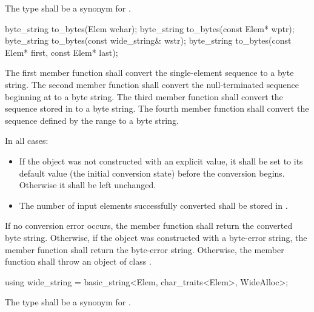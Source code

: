\begin{itemdescr}
\pnum
The type shall be a synonym for .
\end{itemdescr}

%
\begin{itemdecl}
byte_string to_bytes(Elem wchar);
byte_string to_bytes(const Elem* wptr);
byte_string to_bytes(const wide_string& wstr);
byte_string to_bytes(const Elem* first, const Elem* last);
\end{itemdecl}

\begin{itemdescr}
\pnum
\effects
The first member function shall convert the single-element sequence  to a byte string.
The second member function shall convert the null-terminated sequence beginning at  to
a byte string. The third member function shall convert the sequence stored in  to a
byte string. The fourth member function shall convert the sequence defined by the
range  to a byte string.

\pnum
In all cases:

\begin{itemize}
\item If the  object was not constructed with an explicit value, it
shall be
set to its default value (the initial conversion state) before the
conversion begins. Otherwise it shall be left unchanged.
\item The number of input elements successfully converted shall be stored
in .
\end{itemize}

\pnum
\returns
If no conversion error occurs, the member function shall return the converted byte string.
Otherwise, if the object was constructed with a byte-error string, the
member function shall return the byte-error string.
Otherwise, the member function shall throw an object of class .
\end{itemdescr}

%
\begin{itemdecl}
using wide_string = basic_string<Elem, char_traits<Elem>, WideAlloc>;
\end{itemdecl}

\begin{itemdescr}
\pnum
The type shall be a synonym for .
\end{itemdescr}

